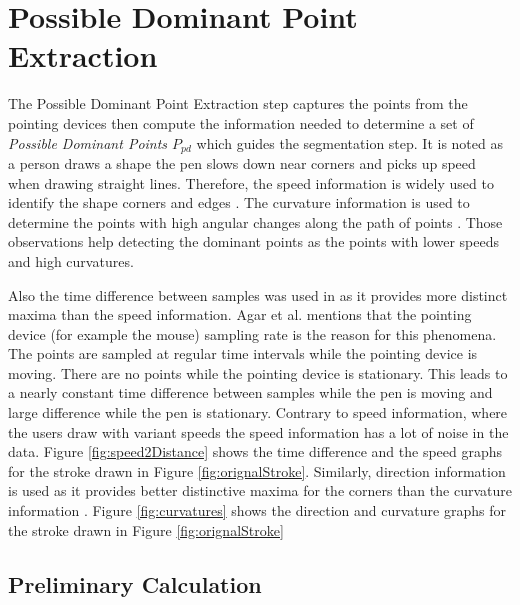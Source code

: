 \section{Possible Dominant Point Extraction}
\label{sec:Preprocessing}
The Possible Dominant Point Extraction step captures the points from the pointing devices then compute the information needed to determine a set of  \textit{Possible Dominant Points $P_{pd}$} which guides the segmentation step. It is noted as a person draws a shape the pen slows down near corners and picks up speed when drawing straight lines. Therefore, the speed information is widely used to identify the shape corners and edges \cite{earlyprocess}. The curvature information is used to determine the points with high angular changes along the path of points \cite{meanshift10}. Those observations help detecting the dominant points as the points with lower speeds and high curvatures. 

Also the time difference between samples was used in \cite{polygonfeedback31} as it provides more distinct maxima than the speed information. Agar et al. \cite{polygonfeedback31} mentions that the pointing device (for example the mouse) sampling rate is the reason for this phenomena. The points are sampled at regular time intervals while the pointing device is moving. There are no points while the pointing device is stationary. This leads to a nearly constant time difference between samples while the pen is moving and large difference while the pen is stationary. Contrary to speed information, where the users draw with variant speeds the speed information has a lot of noise in the data. Figure \ref{fig:speed2Distance} shows the time difference and the speed graphs for the stroke drawn in Figure \ref{fig:orignalStroke}.  Similarly, direction information is used as it provides better distinctive maxima for the corners than the curvature information \cite{meanshift10}. Figure \ref{fig:curvatures} shows the direction and curvature graphs for the stroke drawn in Figure \ref{fig:orignalStroke}

\subsection{Preliminary Calculation}
\label{sec:CurvatureCalculation}
  
